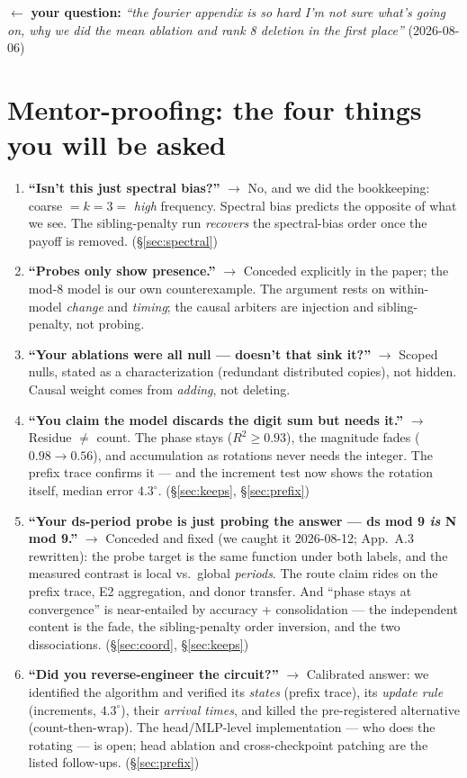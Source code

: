 \documentclass[11pt]{article}
\newcommand{\yourq}[2]{%
  \par\vspace{4pt}\noindent
  \textcolor{qcol}{$\leftarrow$ \textbf{your question:}
  \textit{``#1''}\; \textnormal{(#2)}}\par\vspace{4pt}}
\begin{document}
\yourq{the fourier appendix is so hard I'm not sure what's going on, why we did
the mean ablation and rank 8 deletion in the first place}{2026-08-06}

\section{Mentor-proofing: the four things you will be asked}

\begin{enumerate}[leftmargin=*,itemsep=4pt]
\item \textbf{``Isn't this just spectral bias?''} $\to$ No, and we did the
bookkeeping: coarse $= k{=}3 =$ \emph{high} frequency. Spectral bias predicts the
opposite of what we see. The sibling-penalty run \emph{recovers} the spectral-bias
order once the payoff is removed. (\S\ref{sec:spectral})

\item \textbf{``Probes only show presence.''} $\to$ Conceded explicitly in the
paper; the mod-8 model is our own counterexample. The argument rests on
within-model \emph{change} and \emph{timing}; the causal arbiters are injection and
sibling-penalty, not probing.

\item \textbf{``Your ablations were all null --- doesn't that sink it?''} $\to$
Scoped nulls, stated as a characterization (redundant distributed copies), not
hidden. Causal weight comes from \emph{adding}, not deleting.

\item \textbf{``You claim the model discards the digit sum but needs it.''} $\to$
Residue $\ne$ count. The phase stays ($R^2 \ge 0.93$), the magnitude fades
($0.98 \to 0.56$), and accumulation as rotations never needs the integer. The
prefix trace confirms it --- and the increment test now shows the rotation itself,
median error $4.3^\circ$. (\S\ref{sec:keeps}, \S\ref{sec:prefix})

\item \textbf{``Your ds-period probe is just probing the answer --- ds mod 9
\emph{is} N mod 9.''} $\to$ Conceded and fixed (we caught it 2026-08-12; App.~A.3
rewritten): the probe target is the same function under both labels, and the
measured contrast is local vs.\ global \emph{periods}. The route claim rides on
the prefix trace, E2 aggregation, and donor transfer. And ``phase stays at
convergence'' is near-entailed by accuracy + consolidation --- the independent
content is the fade, the sibling-penalty order inversion, and the two
dissociations. (\S\ref{sec:coord}, \S\ref{sec:keeps})

\item \textbf{``Did you reverse-engineer the circuit?''} $\to$ Calibrated answer:
we identified the algorithm and verified its \emph{states} (prefix trace), its
\emph{update rule} (increments, $4.3^\circ$), their \emph{arrival times}, and
killed the pre-registered alternative (count-then-wrap). The head/MLP-level
implementation --- who does the rotating --- is open; head ablation and
cross-checkpoint patching are the listed follow-ups. (\S\ref{sec:prefix})
\end{enumerate}
\end{document}
